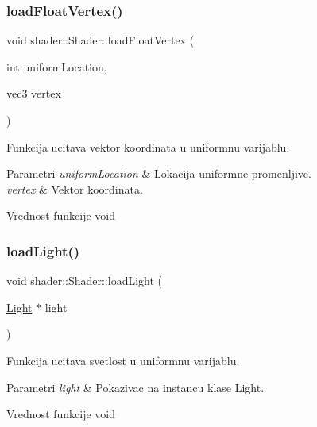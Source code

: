 \subsubsection{\texorpdfstring{load\+Float\+Vertex()}{loadFloatVertex()}}
{\footnotesize\ttfamily void shader\+::\+Shader\+::load\+Float\+Vertex (\begin{DoxyParamCaption}\item[{int}]{uniform\+Location,  }\item[{vec3}]{vertex }\end{DoxyParamCaption})}



Funkcija ucitava vektor koordinata u uniformnu varijablu. 


\begin{DoxyParams}{Parametri}
{\em uniform\+Location} & Lokacija uniformne promenljive. \\
\hline
{\em vertex} & Vektor koordinata. \\
\hline
\end{DoxyParams}
\begin{DoxyReturn}{Vrednost funkcije}
void 
\end{DoxyReturn}
\mbox{\label{classshader_1_1Shader_abe287aa3d352de4e8aac6677666b90d1}} 
\subsubsection{\texorpdfstring{load\+Light()}{loadLight()}}
{\footnotesize\ttfamily void shader\+::\+Shader\+::load\+Light (\begin{DoxyParamCaption}\item[{\hyperlink{classentity_1_1Light}{Light} $\ast$}]{light }\end{DoxyParamCaption})}



Funkcija ucitava svetlost u uniformnu varijablu. 


\begin{DoxyParams}{Parametri}
{\em light} & Pokazivac na instancu klase Light. \\
\hline
\end{DoxyParams}
\begin{DoxyReturn}{Vrednost funkcije}
void 
\end{DoxyReturn}
\mbox{\label{classshader_1_1Shader_ac2d90fdd4dfb7077046ec35b050660ee}} 
